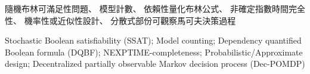 




\newcommand{\myenglishkeywords}{
  Stochastic Boolean satisfiability (SSAT);
  Model counting;
  Dependency quantified Boolean formula (DQBF);
  NEXPTIME-completeness;
  Probabilistic/Approximate design;
  Decentralized partially observable Markov decision process (Dec-POMDP)
}

\newcommand{\mychinesekeywords}{
  隨機布林可滿足性問題、
  模型計數、
  依賴性量化布林公式、
  非確定指數時間完全性、
  機率性或近似性設計、
  分散式部份可觀察馬可夫決策過程
}

\renewcommand{\baselinestretch}{1.0}

\renewcommand{\baselinestretch}{2.0}



\frontmatter
\begin{acknowledgements}
  
\end{acknowledgements}
\begin{abstractzh}{\mychinesekeywords}
  
\end{abstractzh}
\begin{abstracten}{\myenglishkeywords}
  
\end{abstracten}


\tableofcontents
\listoffigures
\listoftables
\cleardoublepage
{}
{}
\listofalgorithms

\mainmatter













